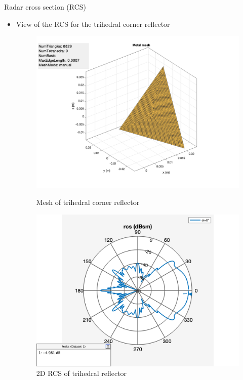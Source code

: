 \documentclass{beamer}
\newcounter{section}
\begin{document}
\begin{frame}[t]{Radar cross section (RCS)}
	\begin{itemize}
	    \item View of the RCS for the trihedral corner reflector
        \vspace{0.5\baselineskip}
            \begin{figure}
                \centering
                \begin{minipage}{0.47\textwidth}
                    \centering
                    \includegraphics[height=0.7\textwidth]{figures/mesh_cr.png}
                    \caption{Mesh of trihedral corner reflector}
                \end{minipage}
                \begin{minipage}{0.47\textwidth}
                    \centering
                    \includegraphics[height=0.7\textwidth]{figures/rcs_cr.png}
                    \caption{2D RCS of trihedral reflector}
                \end{minipage}
            \end{figure}
	\end{itemize}
\end{frame}
\end{document}

